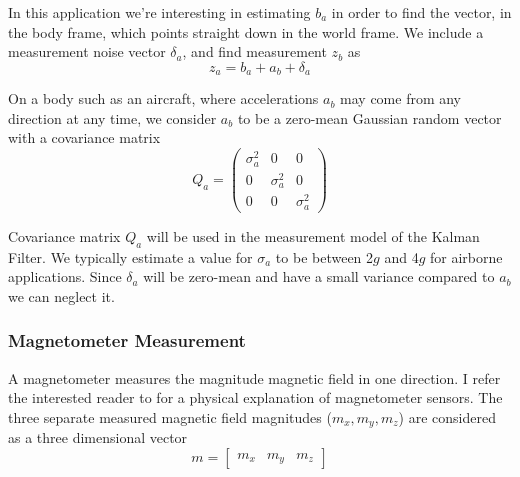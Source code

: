 \documentclass[12pt]{report}
\begin{document}
In this application we're interesting in estimating $b_a$ in order to find the vector, in the body frame, which points straight down in the world frame. We include a measurement noise vector $\delta_a$, and find measurement $z_b$ as
\begin{equation} \label{eq:findgb}
  z_a = b_a + a_b + \delta_a
\end{equation}

On a body such as an aircraft, where accelerations $a_b$ may come from any direction at any time, we consider $a_b$ to be a zero-mean Gaussian random vector with a covariance matrix 
\begin{equation} \label{eq:Qa}
  Q_a = \begin{pmatrix} \sigma_a^2 & 0 & 0 \\
	                      0 & \sigma_a^2 & 0 \\ 
	                      0 & 0 & \sigma_a^2 \end{pmatrix} 
\end{equation}

Covariance matrix $Q_a$ will be used in the measurement model of the Kalman Filter. We typically estimate a value for $\sigma_a$ to be between 2$g$ and 4$g$ for airborne applications. Since $\delta_a$ will be zero-mean and have a small variance compared to $a_b$ we can neglect it.

\subsubsection{Magnetometer Measurement}

A magnetometer measures the magnitude magnetic field in one direction. I refer the interested reader to \cite{wikimagnetometer} for a physical explanation of magnetometer sensors. The three separate measured magnetic field magnitudes ($m_x, m_y, m_z$) are considered as a three dimensional vector
\begin{equation} \label{eq:defb}
  m = \begin{bmatrix} m_x & m_y & m_z \end{bmatrix}
\end{equation}
\end{document}
